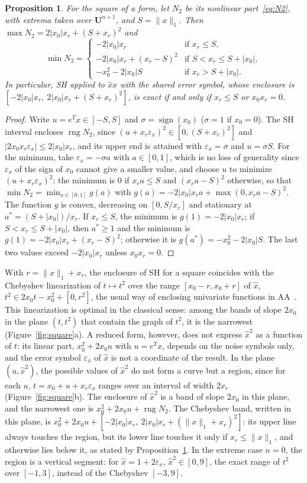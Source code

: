 \documentclass[11pt]{article}
\newtheorem{propo}{Proposition}
\theoremstyle{definition}
\newcommand{\U}{\mathbf{U}}
\newcommand{\eps}{\varepsilon}
\newcommand{\ex}{\eps_x}
\newcommand{\rng}{\operatorname{rng}}
\begin{document}
\begin{propo}
\label{prop:square}
For the square of a form, let $N_2$ be its nonlinear part~\eqref{eq:N2}, with extrema taken over $\U^{n+1}$, and $S=\|x\|_1$. Then $\max N_2=2|x_0|x_r+(S+x_r)^2$ and
\[
\min N_2=\begin{cases}-2|x_0|x_r & \text{if } x_r\le S,\\ -2|x_0|x_r+(x_r-S)^2 & \text{if } S<x_r\le S+|x_0|,\\ -x_0^2-2|x_0|S & \text{if } x_r>S+|x_0|.\end{cases}
\]
In particular, SH applied to $\hat x\hat x$ with the shared error symbol, whose enclosure is $[-2|x_0|x_r,\ 2|x_0|x_r+(S+x_r)^2]$, is exact if and only if $x_r\le S$ or $x_0x_r=0$.
\end{propo}
\begin{proof}
Write $u=e^Tx\in[-S,S]$ and $\sigma=\operatorname{sign}(x_0)$ ($\sigma=1$ if $x_0=0$). The SH interval encloses $\rng N_2$, since $(u+x_r\ex)^2\in[0,(S+x_r)^2]$ and $|2x_0x_r\ex|\le2|x_0|x_r$, and its upper end is attained with $\ex=\sigma$ and $u=\sigma S$. For the minimum, take $\ex=-\sigma a$ with $a\in[0,1]$, which is no loss of generality since $\ex$ of the sign of $x_0$ cannot give a smaller value, and choose $u$ to minimize $(u+x_r\ex)^2$: the minimum is $0$ if $x_ra\le S$ and $(x_ra-S)^2$ otherwise, so that $\min N_2=\min_{a\in[0,1]}g(a)$ with $g(a)=-2|x_0|x_ra+\max(0,x_ra-S)^2$. The function $g$ is convex, decreasing on $[0,S/x_r]$ and stationary at $a^*=(S+|x_0|)/x_r$. If $x_r\le S$, the minimum is $g(1)=-2|x_0|x_r$; if $S<x_r\le S+|x_0|$, then $a^*\ge1$ and the minimum is $g(1)=-2|x_0|x_r+(x_r-S)^2$; otherwise it is $g(a^*)=-x_0^2-2|x_0|S$. The last two values exceed $-2|x_0|x_r$ unless $x_0x_r=0$.
\end{proof}
With $r=\|x\|_1+x_r$, the enclosure of SH for a square coincides with the Chebyshev linearization of $t\mapsto t^2$ over the range $[x_0-r,x_0+r]$ of $\hat x$, $t^2\in 2x_0t-x_0^2+[0,r^2]$, the usual way of enclosing univariate functions in AA~\cite{stolfi1997self}. This linearization is optimal in the classical sense: among the bands of slope $2x_0$ in the plane $(t,t^2)$ that contain the graph of $t^2$, it is the narrowest (Figure~\ref{fig:square}a). A reduced form, however, does not express $\hat x^2$ as a function of $t$: its linear part, $x_0^2+2x_0u$ with $u=e^Tx$, depends on the noise symbols only, and the error symbol $\ex$ of $\hat x$ is not a coordinate of the result. In the plane $(u,\hat x^2)$, the possible values of $\hat x^2$ do not form a curve but a region, since for each $u$, $t=x_0+u+x_r\ex$ ranges over an interval of width $2x_r$ (Figure~\ref{fig:square}b). The enclosure of $\hat x^2$ is a band of slope $2x_0$ in this plane, and the narrowest one is $x_0^2+2x_0u+\rng N_2$. The Chebyshev band, written in this plane, is $x_0^2+2x_0u+[-2|x_0|x_r,\ 2|x_0|x_r+(\|x\|_1+x_r)^2]$: its upper line always touches the region, but its lower line touches it only if $x_r\le\|x\|_1$, and otherwise lies below it, as stated by Proposition~\ref{prop:square}. In the extreme case $n=0$, the region is a vertical segment: for $\hat x=1+2\ex$, $\hat x^2\in[0,9]$, the exact range of $t^2$ over $[-1,3]$, instead of the Chebyshev $[-3,9]$.
\end{document}
